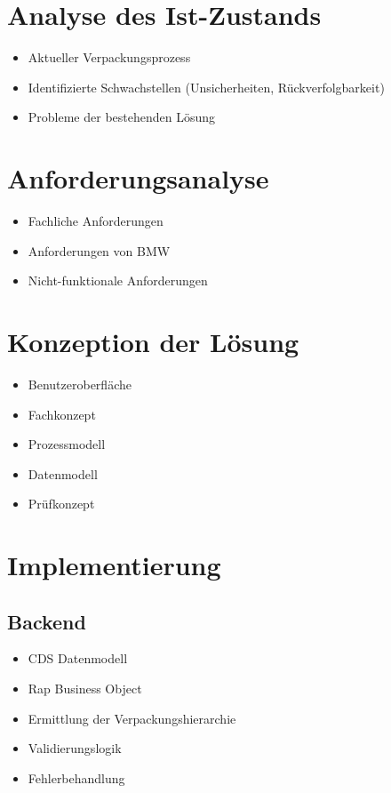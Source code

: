 \documentclass[a4paper,12pt]{scrartcl}
\begin{document}
\section{Analyse des Ist-Zustands}
\begin{itemize}
  \item Aktueller Verpackungsprozess
  \item Identifizierte Schwachstellen (Unsicherheiten, Rückverfolgbarkeit)
  \item Probleme der bestehenden Lösung
\end{itemize}
\section{Anforderungsanalyse}
\begin{itemize}
  \item Fachliche Anforderungen
  \item Anforderungen von BMW
  \item Nicht-funktionale Anforderungen
\end{itemize}

\section{Konzeption der Lösung}


\begin{itemize}
  \item Benutzeroberfläche
  \item Fachkonzept
  \item Prozessmodell
  \item Datenmodell
  \item Prüfkonzept
\end{itemize}

\section{Implementierung}
\subsection{Backend} 
\begin{itemize}
  \item CDS Datenmodell
  \item Rap Business Object
  \item Ermittlung der Verpackungshierarchie
  \item Validierungslogik
  \item Fehlerbehandlung
\end{itemize}
\end{document}

